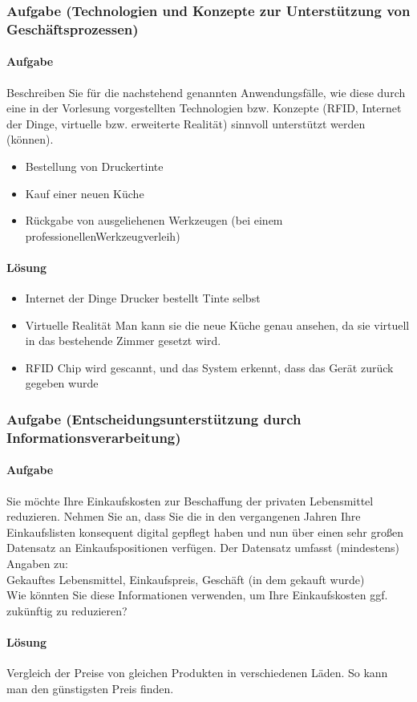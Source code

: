\subsubsection*{Aufgabe (Technologien und Konzepte zur Unterstützung von Geschäftsprozessen)}
\paragraph*{Aufgabe}
    Beschreiben Sie für die nachstehend genannten Anwendungsfälle, wie diese durch eine in der Vorlesung vorgestellten Technologien bzw. Konzepte (RFID, Internet der Dinge, virtuelle bzw. erweiterte Realität) sinnvoll unterstützt werden (können).
    \begin{itemize}
        \item Bestellung von Druckertinte
        \item Kauf einer neuen Küche
        \item Rückgabe von ausgeliehenen Werkzeugen (bei einem professionellenWerkzeugverleih)
    \end{itemize}
\paragraph*{Lösung}
    \begin{itemize}
        \item Internet der Dinge \textrightarrow Drucker bestellt Tinte selbst
        \item Virtuelle Realität \textrightarrow Man kann sie die neue Küche genau ansehen, da sie virtuell in das bestehende Zimmer gesetzt wird.
        \item RFID \textrightarrow Chip wird gescannt, und das System erkennt, dass das Gerät zurück gegeben wurde
    \end{itemize}

\subsubsection*{Aufgabe (Entscheidungsunterstützung durch Informationsverarbeitung)}
\paragraph*{Aufgabe}
    Sie möchte Ihre Einkaufskosten zur Beschaffung der privaten Lebensmittel reduzieren. Nehmen Sie an, dass Sie die in den vergangenen Jahren Ihre Einkaufslisten konsequent digital gepflegt haben und nun über einen sehr großen Datensatz an Einkaufspositionen verfügen. Der Datensatz umfasst (mindestens) Angaben zu: \\
    Gekauftes Lebensmittel, Einkaufspreis, Geschäft (in dem gekauft wurde) \\
    Wie könnten Sie diese Informationen verwenden, um Ihre Einkaufskosten ggf. zukünftig zu reduzieren?
\paragraph*{Lösung}
    Vergleich der Preise von gleichen Produkten in verschiedenen Läden. So kann man den günstigsten Preis finden.



